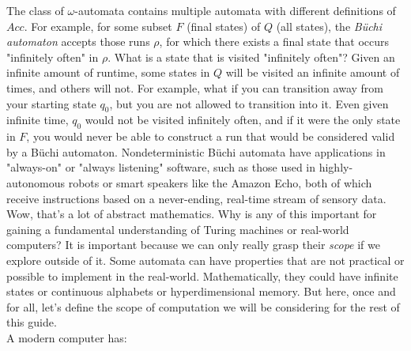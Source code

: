 \begin{tcolorbox}[breakable, enhanced, colback=textbook-blue, sharp corners]
	The class of $\omega$-automata contains multiple automata with different definitions of $Acc$. For example, for some subset $F$ (final states) of $Q$ (all states), the \textit{B\"{u}chi automaton} accepts those runs $\rho$, for which there exists a final state that occurs "infinitely often" in $\rho$. What is a state that is visited "infinitely often"? Given an infinite amount of runtime, some states in $Q$ will be visited an infinite amount of times, and others will not. For example, what if you can transition away from your starting state $q_0$, but you are not allowed to transition into it. Even given infinite time, $q_0$ would not be visited infinitely often, and if it were the only state in $F$, you would never be able to construct a run that would be considered valid by a B\"{u}chi automaton. Nondeterministic B\"{u}chi automata have applications in "always-on" or "always listening" software, such as those used in highly-autonomous robots or smart speakers like the Amazon Echo, both of which receive instructions based on a never-ending, real-time stream of sensory data. \\
	
	Wow, that's a lot of abstract mathematics. Why is any of this important for gaining a fundamental understanding of Turing machines or real-world computers? It is important because we can only really grasp their \textit{scope} if we explore outside of it. Some automata can have properties that are not practical or possible to implement in the real-world. Mathematically, they could have infinite states or continuous alphabets or hyperdimensional memory. But here, once and for all, let's define the scope of computation we will be considering for the rest of this guide. \\
	
	A modern computer has:
	

\end{tcolorbox}
